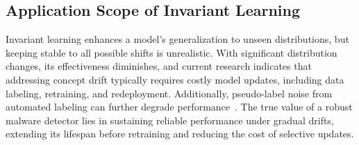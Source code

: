 \subsection{Application Scope of Invariant Learning}
Invariant learning enhances a model’s generalization to unseen distributions, but keeping stable to all possible shifts is unrealistic. With significant distribution changes, its effectiveness diminishes, and current research indicates that addressing concept drift typically requires costly model updates, including data labeling, retraining, and redeployment. Additionally, pseudo-label noise from automated labeling can further degrade performance~\cite{labelless}. The true value of a robust malware detector lies in sustaining reliable performance under gradual drifts, extending its lifespan before retraining and reducing the cost of selective updates.